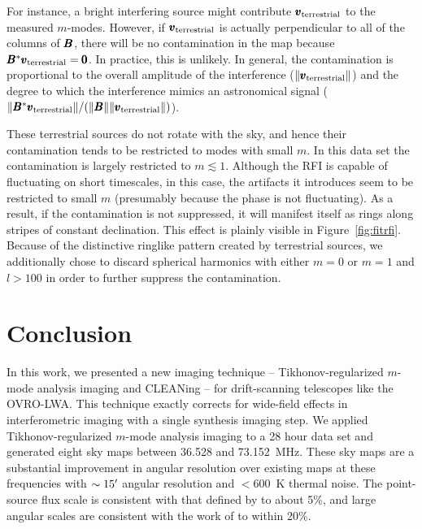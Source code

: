 \begin{bibunit}
For instance, a bright interfering source might contribute $\pmb v_\text{terrestrial}$ to the measured
$m$-modes. However, if $\pmb v_\text{terrestrial}$ is actually perpendicular to all of the columns of
$\pmb B$, there will be no contamination in the map because $\pmb B^*\pmb v_\text{terrestrial} = \pmb 0$.
In practice, this is unlikely. In general, the contamination is proportional to the overall amplitude
of the interference ($\|\pmb v_\text{terrestrial}\|$) and the degree to which the interference mimics
an astronomical signal ($\|\pmb B^*\pmb v_\text{terrestrial}\|/(\|\pmb B\|\|\pmb v_\text{terrestrial}\|)$).

These terrestrial sources do not rotate with the sky, and hence their contamination tends to be
restricted to modes with small $m$. In this data set the contamination is largely restricted to $m
\lesssim 1$. Although the RFI is capable of fluctuating on short timescales, in this case, the
artifacts it introduces seem to be restricted to small $m$ (presumably because the phase is not
fluctuating).  As a result, if the contamination is not suppressed, it will manifest itself as rings
along stripes of constant declination. This effect is plainly visible in Figure~\ref{fig:fitrfi}.
Because of the distinctive ringlike pattern created by terrestrial sources, we additionally chose to
discard spherical harmonics with either $m=0$ or $m=1$ and $l>100$ in order to further suppress the
contamination.

\section{Conclusion}\label{sec:conclusion1}

In this work, we presented a new imaging technique -- Tikhonov-regularized $m$-mode analysis imaging
and CLEANing -- for drift-scanning telescopes like the OVRO-LWA.  This technique exactly corrects
for wide-field effects in interferometric imaging with a single synthesis imaging step.  We applied
Tikhonov-regularized $m$-mode analysis imaging to a 28 hour data set and generated eight sky maps
between 36.528 and 73.152~MHz.  These sky maps are a substantial improvement in angular resolution
over existing maps at these frequencies with $\sim15\mbox{$^\prime$}$ angular resolution and $<600$~K thermal
noise. The point-source flux scale is consistent with that defined by \citet{2012MNRAS.423L..30S} to
about 5\%, and large angular scales are consistent with the work of \citet{2017MNRAS.469.4537D} to
within 20\%.


\end{bibunit}
